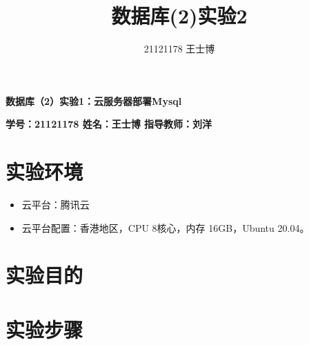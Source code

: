 \documentclass{article}
\title{\Huge 数据库(2)实验2}
\author{21121178 王士博}
\begin{document}
\begin{center}
    \textbf{\huge 数据库（2）实验1：云服务器部署Mysql}
\end{center}
\begin{center}
    \textbf{\large \textbf{学号：21121178 \quad 姓名：王士博 \quad 指导教师：刘洋}}
\end{center}
\hrulefill
\section{实验环境}
\begin{itemize}
    \item 云平台：腾讯云
    \item 云平台配置：香港地区，CPU 8核心，内存 16GB，Ubuntu 20.04。
\end{itemize}
\section{实验目的}
\section{实验步骤}
\end{document}

